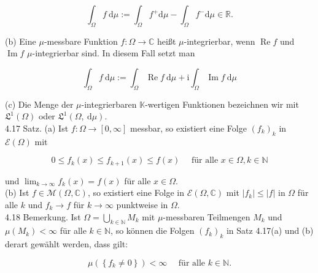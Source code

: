 \documentclass[10pt, letterpaper]{article}
\begin{document}
$$
\int_{\Omega} f \mathrm{~d} \mu:=\int_{\Omega} f^{+} \mathrm{d} \mu-\int_{\Omega} f^{-} \mathrm{d} \mu \in \mathbb{R} .
$$

(b) Eine $\mu$-messbare Funktion $f: \Omega \rightarrow \mathbb{C}$ heißt $\mu$-integrierbar, wenn $\operatorname{Re} f$ und $\operatorname{Im} f$ $\mu$-integrierbar sind. In diesem Fall setzt man

$$
\int_{\Omega} f \mathrm{~d} \mu:=\int_{\Omega} \operatorname{Re} f \mathrm{~d} \mu+\mathrm{i} \int_{\Omega} \operatorname{Im} f \mathrm{~d} \mu
$$

(c) Die Menge der $\mu$-integrierbaren $\mathbb{K}$-wertigen Funktionen bezeichnen wir mit $\mathfrak{L}^{1}(\Omega)$ oder $\mathfrak{L}^{1}(\Omega, \mathrm{~d} \mu)$.\\
4.17 Satz. (a) Ist $f: \Omega \rightarrow[0, \infty]$ messbar, so existiert eine Folge $\left(f_{k}\right)_{k}$ in $\mathcal{E}(\Omega)$ mit

$$
0 \leq f_{k}(x) \leq f_{k+1}(x) \leq f(x) \quad \text { für alle } x \in \Omega, k \in \mathbb{N}
$$

und $\lim _{k \rightarrow \infty} f_{k}(x)=f(x)$ für alle $x \in \Omega$.\\
(b) Ist $f \in \mathcal{M}(\Omega, \mathbb{C})$, so existiert eine Folge in $\mathcal{E}(\Omega, \mathbb{C})$ mit $\left|f_{k}\right| \leq|f|$ in $\Omega$ für alle $k$ und $f_{k} \rightarrow f$ für $k \rightarrow \infty$ punktweise in $\Omega$.\\
4.18 Bemerkung. Ist $\Omega=\bigcup_{k \in \mathbb{N}} M_{k}$ mit $\mu$-messbaren Teilmengen $M_{k}$ und $\mu\left(M_{k}\right)<\infty$ für alle $k \in \mathbb{N}$, so können die Folgen $\left(f_{k}\right)_{k}$ in Satz 4.17(a) und (b) derart gewählt werden, dass gilt:

$$
\mu\left(\left\{f_{k} \neq 0\right\}\right)<\infty \quad \text { für alle } k \in \mathbb{N} .
$$
\end{document}
